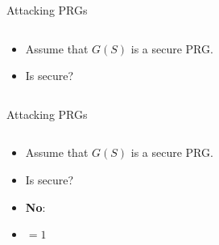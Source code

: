 \documentclass[aspectratio=169, lualatex, handout]{beamer}
\begin{document}
\begin{frame}{Attacking PRGs}
	\begin{columns}[c]
		\begin{column}{0.5\textwidth}
			\begin{itemize}[<+->]
				\item Assume that $G(S)$ is a secure PRG.
				\item Is  secure?
			\end{itemize}
		\end{column}
		\begin{column}{0.5\textwidth}
		\end{column}
	\end{columns}
\end{frame}

\begin{frame}{Attacking PRGs}
	\begin{columns}[c]
		\begin{column}{0.45\textwidth}
			\begin{itemize}[<+->]
				\item Assume that $G(S)$ is a secure PRG.
				\item Is  secure?
				\item \textbf{No}:
				\item {} $ = 1$
			\end{itemize}
		\end{column}
		\begin{column}{0.55\textwidth}
			\begin{flushright}
			\end{flushright}
		\end{column}
	\end{columns}
\end{frame}
\end{document}
